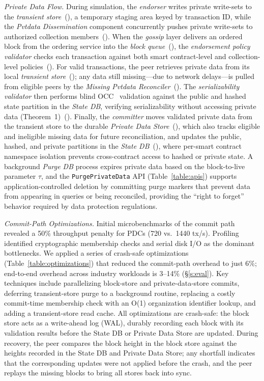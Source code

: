 \textit{Private Data Flow.}
During simulation, the \textit{endorser} writes private write-sets to the \textit{transient store}~(), a temporary staging area keyed by transaction ID, while the \textit{Pvtdata Dissemination} component concurrently pushes private write-sets to authorized collection members~(). When the \textit{gossip} layer delivers an ordered block from the ordering service into the \textit{block queue}~(), the \textit{endorsement policy validator} checks each transaction against both smart contract-level and collection-level policies~(). For valid transactions, the peer retrieves private data from its local \textit{transient store}~(); any data still missing---due to network delays---is pulled from eligible peers by the \textit{Missing Pvtdata Reconciler}~(). The \textit{serializability validator} then performs blind OCC~\cite{occ} validation against the public and hashed state partition in the \textit{State DB}, verifying serializability without accessing private data (Theorem~1)~(). Finally, the \textit{committer} moves validated private data from the transient store to the durable \textit{Private Data Store}~(), which also tracks eligible and ineligible missing data for future reconciliation, and updates the public, hashed, and private partitions in the \textit{State DB}~(), where per-smart contract namespace isolation prevents cross-contract access to hashed or private state. A background \textit{Purge DB} process expires private data based on the block-to-live parameter $\tau$, and the \texttt{PurgePrivateData} API (Table~\ref{table:apis}) supports application-controlled deletion by committing purge markers that prevent data from appearing in queries or being reconciled, providing the ``right to forget'' behavior required by data protection regulations.

\textit{Commit-Path Optimizations.}
Initial microbenchmarks of the commit path revealed a 50\% throughput penalty for PDCs (720 vs.\ 1440 tx/s). Profiling identified cryptographic membership checks and serial disk I/O as the dominant bottlenecks. We applied a series of crash-safe optimizations (Table~\ref{table:optimizations}) that reduced the commit-path overhead to just 6\%; end-to-end overhead across industry workloads is 3--14\% (\S\ref{s:eval}). Key techniques include parallelizing block-store and private-data-store commits, deferring transient-store purge to a background routine, replacing a costly commit-time membership check with an O(1) organization identifier lookup, and adding a transient-store read cache. All optimizations are crash-safe: the block store acts as a write-ahead log (WAL), durably recording each block with its validation results before the State DB or Private Data Store are updated. During recovery, the peer compares the block height in the block store against the heights recorded in the State DB and Private Data Store; any shortfall indicates that the corresponding updates were not applied before the crash, and the peer replays the missing blocks to bring all stores back into sync.
